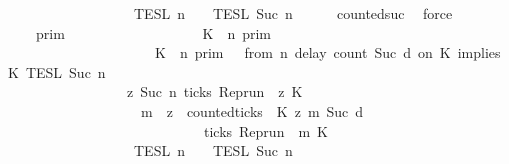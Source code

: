 \begin{isabellebody}
\ \ \ \ \ \ \ \ \ \ \ \ \ \ \ \ {\isasyminter}\ {\isasymlbrakk}{\isasymlbrakk}\ {\isasymPsi}\ {\isasymrbrakk}{\isasymrbrakk}\isactrlsub T\isactrlsub E\isactrlsub S\isactrlsub L\isactrlbsup {\isasymge}\ n\isactrlesup \ {\isasyminter}\ {\isasymlbrakk}{\isasymlbrakk}\ {\isasymPhi}\ {\isasymrbrakk}{\isasymrbrakk}\isactrlsub T\isactrlsub E\isactrlsub S\isactrlsub L\isactrlbsup {\isasymge}\ Suc\ n\isactrlesup {\isacartoucheclose}\isanewline
\ \ \ \ \isamarkupfalse%
\ counted{\isacharunderscore}suc\ \isamarkupfalse%
\ force\isanewline
\ \ \isamarkupfalse%
\ \isamarkupfalse%
\ {\isacartoucheopen}{\isachardot}{\isachardot}{\isachardot}\ {\isacharequal}\ {\isasymlbrakk}{\isasymlbrakk}\ {\isasymGamma}\ {\isasymrbrakk}{\isasymrbrakk}\isactrlsub p\isactrlsub r\isactrlsub i\isactrlsub m\ \isanewline
\ \ \ \ \ \ \ \ \ \ \ \ \ \ \ \ {\isasyminter}\ {\isacharparenleft}{\isasymlbrakk}\ K\ {\isasymnot}{\isasymUp}\ n\ {\isasymrbrakk}\isactrlsub p\isactrlsub r\isactrlsub i\isactrlsub m\isanewline
\ \ \ \ \ \ \ \ \ \ \ \ \ \ \ \ \ \ \ \ {\isasymunion}\ {\isacharparenleft}{\isasymlbrakk}\ K\ {\isasymUp}\ n\ {\isasymrbrakk}\isactrlsub p\isactrlsub r\isactrlsub i\isactrlsub m\ {\isasyminter}\ {\isasymlbrakk}\ from\ n\ delay\ count\ {\isacharparenleft}Suc\ d{\isacharparenright}\ on\ K\ implies\ K\ {\isasymrbrakk}\isactrlsub T\isactrlsub E\isactrlsub S\isactrlsub L\isactrlbsup {\isasymge}\ Suc\ n\isactrlesup {\isacharparenright}\isanewline
\ \ \ \ \ \ \ \ \ \ \ \ \ \ \ \ \ \ {\isacharparenright}\isanewline
\ \ \ \ \ \ \ \ \ \ \ \ \ \ \ \ {\isasyminter}\ {\isacharbraceleft}{\isasymrho}{\isachardot}\ {\isasymforall}z{\isasymge}\ Suc\ n{\isachardot}\ ticks\ {\isacharparenleft}{\isacharparenleft}Rep{\isacharunderscore}run\ {\isasymrho}{\isacharparenright}\ z\ K\ {\isasymlongrightarrow}\isanewline
\ \ \ \ \ \ \ \ \ \ \ \ \ \ \ \ \ \ \ \ {\isacharparenleft}{\isasymforall}m\ {\isasymge}\ z{\isachardot}\ \ counted{\isacharunderscore}ticks\ {\isasymrho}\ K\ z\ m\ {\isacharparenleft}Suc\ d{\isacharparenright}\isanewline
\ \ \ \ \ \ \ \ \ \ \ \ \ \ \ \ \ \ \ \ \ \ \ \ \ \ \ \ {\isasymlongrightarrow}\ ticks\ {\isacharparenleft}{\isacharparenleft}Rep{\isacharunderscore}run\ {\isasymrho}{\isacharparenright}\ m\ K\ {\isacharbraceright}\isanewline
\ \ \ \ \ \ \ \ \ \ \ \ \ \ \ \ {\isasyminter}\ {\isasymlbrakk}{\isasymlbrakk}\ {\isasymPsi}\ {\isasymrbrakk}{\isasymrbrakk}\isactrlsub T\isactrlsub E\isactrlsub S\isactrlsub L\isactrlbsup {\isasymge}\ n\isactrlesup \ {\isasyminter}\ {\isasymlbrakk}{\isasymlbrakk}\ {\isasymPhi}\ {\isasymrbrakk}{\isasymrbrakk}\isactrlsub T\isactrlsub E\isactrlsub S\isactrlsub L\isactrlbsup {\isasymge}\ Suc\ n\isactrlesup {\isacartoucheclose}\isanewline

\end{isabellebody}
